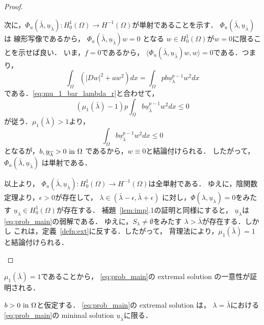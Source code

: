 \begin{proof}
\begin{enumerate}[1.]
        次に，$\Phi_u (\bar{\lambda}, \underline{u}_{\bar{\lambda}}) \colon
        H_0^1(\Omega) \to H^{-1}(\Omega)$が単射であることを示す．
        $\Phi_u (\bar{\lambda}, \underline{u}_{\bar{\lambda}})$は
        線形写像であるから，
        $\Phi_u (\bar{\lambda}, \underline{u}_{\bar{\lambda}})w = 0$
        となる
        $w \in H_0^1(\Omega)$が$w = 0$に限ることを示せば良い．
        いま，$f = 0$であるから，
        $\langle \Phi_u (\bar{\lambda},
        \underline{u}_{\bar{\lambda}})w , w \rangle = 0$である．つまり，
        \[
         \int_\Omega \left( \lvert Dw \rvert^2 + aw^2 \right)dx =
        \int_\Omega p b\underline{u}_\lambda^{p-1} w^2 dx
        \]
        である．\eqref{eq:mu_1_bar_lambda_r}と合わせて，
        \[
         \left( \mu_1(\bar{\lambda}) - 1 \right) p \int_\Omega b
        \underline{u}_{\bar{\lambda}}^{p-1} w^2 dx \leq 0
        \]
        が従う．$\mu_1 ( \bar{\lambda}) > 1$より，
        \[
         \int_\Omega b
        \underline{u}_{\bar{\lambda}}^{p-1} w^2 dx \leq 0 
        \]
        となるが，$b , \underline{u}_{\overline{\lambda}} > 0 ~\text{in}~ \Omega$
        であるから，$w \equiv 0$と結論付けられる．
        したがって，
        $\Phi_u (\bar{\lambda}, \underline{u}_{\bar{\lambda}})$
        は単射である．

        以上より，
        $\Phi_u (\bar{\lambda}, \underline{u}_{\bar{\lambda}}) \colon
        H_0^1(\Omega) \to H^{-1}(\Omega)$は全単射である．
        ゆえに，陰関数定理より，$\epsilon > 0$が存在して，
        $\lambda \in (\bar{\lambda} - \epsilon, \bar{\lambda} +
        \epsilon)$
        に対し，$\Phi (\lambda, \underline{u}_{\lambda}) = 0$をみたす
        $\underline{u}_\lambda \in H_0^1(\Omega)$が存在する．
        補題~\ref{lem:imp}.1の証明と同様にすると，
        $\underline{u}_\lambda$は\ref{eq:prob_main}の弱解である．
        ゆえに，$S_\lambda \neq \emptyset$をみたす
        $\lambda > \bar{\lambda}$が存在する．しかし
        これは，定義~\ref{defn:ext}に反する．したがって，
        背理法により，$\mu_1(\bar{\lambda}) = 1$と結論付けられる．
 \end{enumerate}
\end{proof}

$\mu_1(\bar{\lambda}) = 1$であることから，
\ref{eq:prob_main}の extremal solution の一意性が証明される．

\begin{prop} \label{prop:ext_uni}
 $b > 0 ~\text{in}~ \Omega$と仮定する．
 \ref{eq:prob_main}の extremal solution は，
 $\lambda = \bar{\lambda}$における\ref{eq:prob_main}の minimal
 solution $\underline{u}_{\bar{\lambda}}$に限る．
\end{prop}

